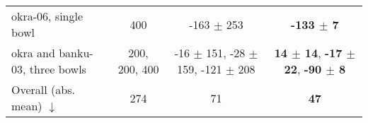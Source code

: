 \documentclass[journal]{IEEEtran}
\begin{document}
\begin{table}[!]
{\begin{tabular}{@{}lccc@{}}
okra-06, single bowl           & 400           & -163 $\pm$ 253                                           & \textbf{-133 $\pm$ 7}                                  \\
okra and banku-03, three bowls & 200, 200, 400 & -16 $\pm$ 151, -28 $\pm$ 159, -121 $\pm$ 208                         & \textbf{14 $\pm$ 14}, \textbf{-17 $\pm$ 22}, \textbf{-90 $\pm$ 8}                     \\ \midrule
Overall (abs. mean) $\downarrow$                       &    274           &      71                                              &   \textbf{47}                                      \\ \bottomrule
\end{tabular}%
}

\end{table}





\end{document}
